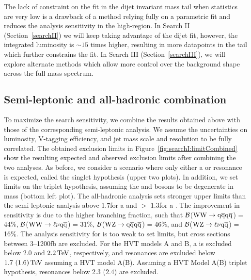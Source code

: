 The lack of constraint on the fit in the dijet invariant mass tail when statistics are very low is a drawback of a method relying fully on a parametric fit and reduces the analysis sensitivity in the high-\mjj region. In Search II (Section~\ref{searchII}) we will keep taking advantage of the dijet fit, however, the integrated luminosity is $\sim 15$ times higher, resulting in more datapoints in the \mjj tail which further constrains the fit. In Search III (Section~\ref{searchIII}), we will explore alternate methods which allow more control over the background shape across the full mass spectrum. 

\subsection{Semi-leptonic and all-hadronic combination}
\label{sec:searchI:resultsComb}
To maximize the search sensitivity, we combine the results obtained above with those of the corresponding semi-leptonic analysis. We assume the uncertainties on luminosity, V-tagging efficiency, and jet mass scale and resolution to be fully correlated. The obtained exclusion limits in Figure~\ref{fig:searchI:limitCombined} show the resulting expected and observed exclusion limits after combining the two analyses. As before, we consider a scenario where only either a \PWpr or \PZpr resonance is expected, called the singlet hypothesis (upper two plots). In addition, we set limits on the triplet hypothesis, assuming the \PWpr and \PZpr bosons to be degenerate in mass (bottom left plot). The all-hadronic analysis sets stronger upper limits than the semi-leptonic analysis above 1.7\TeV for a \PZpr and $>$ 1.3\TeV for a \PWpr. The improvement in sensitivity is due to the higher branching fraction, such that $\cal B$($\mathrm{W}\mathrm{W}\to\mathrm{q}\overline{\mathrm{q}}\mathrm{q}\overline{\mathrm{q}}$) = 44\%, $\cal B$($\mathrm{W}\mathrm{W}\to\ell\nu\mathrm{q}\overline{\mathrm{q}}$) = 31\%, $\cal B$($\mathrm{W}\mathrm{Z}\to\mathrm{q}\overline{\mathrm{q}}\mathrm{q}\overline{\mathrm{q}}$) = 46\%, and $\cal B$($\mathrm{W}\mathrm{Z}\to\ell\nu\mathrm{q}\overline{\mathrm{q}}$) = 16\%. 
The analysis sensitivity for \BulkG is too weak to set limits, but cross sections between 3--1200\unit{fb} are excluded.
For the HVT models A and B, a \PWpr is excluded below $2.0$ and $2.2 \,\text{Te\hspace{-.08em}V}$, respectively, and \PZpr resonances are excluded below $1.7~(1.6)\,\text{Te\hspace{-.08em}V}$ assuming a HVT model A(B). Assuming a HVT Model A(B) triplet hypothesis, resonances below 2.3 (2.4) \TeV are excluded.
